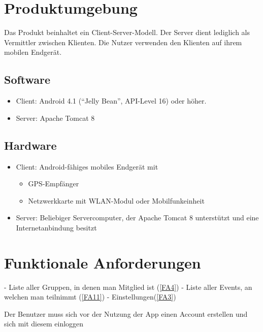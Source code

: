 \documentclass[parskip=full,11pt,twoside]{scrartcl}
\begin{document}
\section{Produktumgebung}
Das Produkt beinhaltet ein Client-Server-Modell.
Der Server dient lediglich als Vermittler zwischen Klienten.
Die Nutzer verwenden den Klienten auf ihrem mobilen Endgerät.
\subsection{Software}
\begin{itemize}
    \item Client: Android 4.1 (\enquote{Jelly Bean}, API-Level 16) oder
        höher.
    \item Server: Apache Tomcat 8
\end{itemize}

\subsection{Hardware}
\begin{itemize}
    \item Client: Android-fähiges mobiles Endgerät mit
        \begin{itemize}
            \item GPS-Empfänger
            \item Netzwerkkarte mit WLAN-Modul oder Mobilfunkeinheit
        \end{itemize}
    \item Server: Beliebiger Servercomputer, der Apache Tomcat 8 unterstützt
        und eine Internetanbindung besitzt
\end{itemize}

\section{Funktionale Anforderungen}

\label{FA1}
- Liste aller Gruppen, in denen man Mitglied ist (\ref{FA4})
- Liste aller Events, an welchen man teilnimmt (\ref{FA11})
- Einstellungen(\ref{FA3})

\label{FA2}
Der Benutzer muss sich vor der Nutzung der App einen Account erstellen und sich mit diesem einloggen
\end{document}
